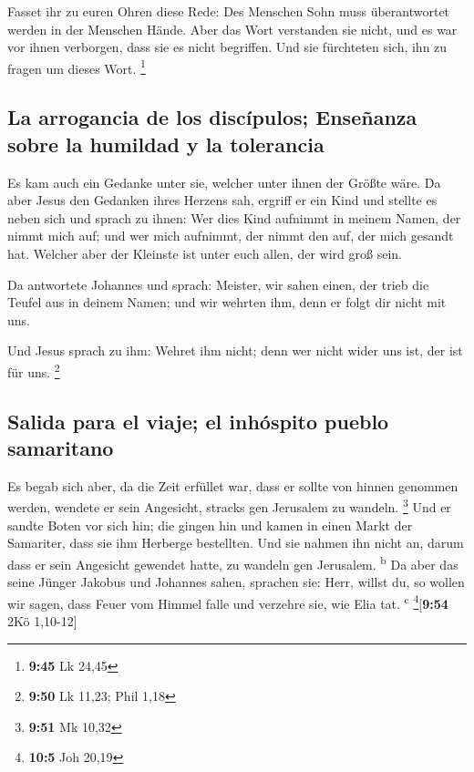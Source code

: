  Fasset ihr zu euren Ohren diese Rede: Des Menschen Sohn
muss überantwortet werden in der Menschen Hände.  Aber
das Wort verstanden sie nicht, und es war vor ihnen verborgen, dass sie
es nicht begriffen. Und sie fürchteten sich, ihn zu fragen um dieses
Wort. \footnote{\textbf{9:45} Lk 24,45}

\hypertarget{la-arrogancia-de-los-discuxedpulos-enseuxf1anza-sobre-la-humildad-y-la-tolerancia}{%
\subsection{La arrogancia de los discípulos; Enseñanza sobre la humildad
y la
tolerancia}\label{la-arrogancia-de-los-discuxedpulos-enseuxf1anza-sobre-la-humildad-y-la-tolerancia}}

 Es kam auch ein Gedanke unter sie, welcher unter ihnen
der Größte wäre.  Da aber Jesus den Gedanken ihres
Herzens sah, ergriff er ein Kind und stellte es neben sich
 und sprach zu ihnen: Wer dies Kind aufnimmt in meinem
Namen, der nimmt mich auf; und wer mich aufnimmt, der nimmt den auf, der
mich gesandt hat. Welcher aber der Kleinste ist unter euch allen, der
wird groß sein.

 Da antwortete Johannes und sprach: Meister, wir sahen
einen, der trieb die Teufel aus in deinem Namen; und wir wehrten ihm,
denn er folgt dir nicht mit uns.

 Und Jesus sprach zu ihm: Wehret ihm nicht; denn wer
nicht wider uns ist, der ist für uns. \footnote{\textbf{9:50} Lk 11,23;
  Phil 1,18}

\hypertarget{salida-para-el-viaje-el-inhuxf3spito-pueblo-samaritano}{%
\subsection{Salida para el viaje; el inhóspito pueblo
samaritano}\label{salida-para-el-viaje-el-inhuxf3spito-pueblo-samaritano}}

 Es begab sich aber, da die Zeit erfüllet war, dass er
sollte von hinnen genommen werden, wendete er sein Angesicht, stracks
gen Jerusalem zu wandeln. \footnote{\textbf{9:51} Mk 10,32}
 Und er sandte Boten vor sich hin; die gingen hin und
kamen in einen Markt der Samariter, dass sie ihm Herberge bestellten.
 Und sie nahmen ihn nicht an, darum dass er sein
Angesicht gewendet hatte, zu wandeln gen Jerusalem. \textsuperscript{b}
 Da aber das seine Jünger Jakobus und Johannes sahen,
sprachen sie: Herr, willst du, so wollen wir sagen, dass Feuer vom
Himmel falle und verzehre sie, wie Elia tat. \textsuperscript{c}
\footnote{\textbf{10:5} Joh 20,19}{[}\textbf{9:54} 2Kö 1,10-12{]}

